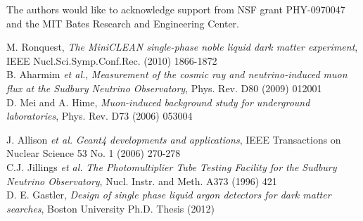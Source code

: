 \documentclass[review,number,sort&compress]{elsarticle}
\begin{document}
\acknowledgements
The authors would like to acknowledge support from NSF grant PHY-0970047 and the MIT Bates Research and Engineering Center.


\begin{thebibliography}{999}

M. Ronquest, \emph{The MiniCLEAN single-phase noble liquid dark matter experiment}, IEEE Nucl.Sci.Symp.Conf.Rec. (2010) 1866-1872 \\

B. Aharmim {\it et al.}, \emph{Measurement of the cosmic ray and neutrino-induced muon flux at the Sudbury Neutrino Observatory}, Phys. Rev. D80 (2009) 012001 \\

D. Mei and A. Hime, \emph{Muon-induced background study for underground laboratories}, Phys. Rev. D73 (2006) 053004

J. Allison {\it et al.} \emph{Geant4 developments and applications}, IEEE Transactions on Nuclear Science 53 No. 1 (2006) 270-278 \\

C.J. Jillings {\it et al.} \emph{The Photomultiplier Tube Testing Facility for the Sudbury Neutrino Observatory}, Nucl. Instr. and Meth. A373 (1996) 421 \\

	D. E. Gastler, \emph{Design of single phase liquid argon detectors for dark matter searches}, Boston University Ph.D. Thesis (2012) \\

\end{thebibliography}
\end{document}
